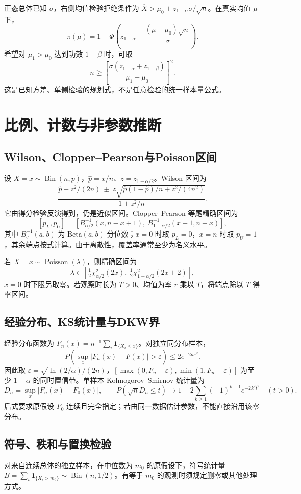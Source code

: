 \documentclass[../main.tex]{subfiles}
\begin{document}
正态总体已知 $\sigma$，右侧均值检验拒绝条件为 $\overline X>\mu_0+z_{1-\alpha}\sigma/\sqrt n$。在真实均值 $\mu$ 下，
\[
\pi(\mu)=1-\Phi\!\left(z_{1-\alpha}-\frac{(\mu-\mu_0)\sqrt n}{\sigma}\right).
\]
希望对 $\mu_1>\mu_0$ 达到功效 $1-\beta$ 时，可取
\[
n\ge\left[\frac{\sigma(z_{1-\alpha}+z_{1-\beta})}{\mu_1-\mu_0}\right]^2.
\]
这是已知方差、单侧检验的规划式，不是任意检验的统一样本量公式。

\section{比例、计数与非参数推断}
\subsection{Wilson、Clopper--Pearson与Poisson区间}
设 $X=x\sim\operatorname{Bin}(n,p)$，$\widehat p=x/n$、$z=z_{1-\alpha/2}$。Wilson 区间为
\[
\frac{\widehat p+z^2/(2n)\ \pm\ z\sqrt{\widehat p(1-\widehat p)/n+z^2/(4n^2)}}{1+z^2/n}.
\]
它由得分检验反演得到，仍是近似区间。Clopper--Pearson 等尾精确区间为
\[
[p_L,p_U]=[B^{-1}_{\alpha/2}(x,n-x+1),\ B^{-1}_{1-\alpha/2}(x+1,n-x)],
\]
其中 $B^{-1}_q(a,b)$ 为 Beta$(a,b)$ 分位数；$x=0$ 时取 $p_L=0$，$x=n$ 时取 $p_U=1$，其余端点按式计算。由于离散性，覆盖率通常至少为名义水平。

若 $X=x\sim\operatorname{Poisson}(\lambda)$，则精确区间为
\[
\lambda\in\left[\tfrac12\chi^2_{\alpha/2}(2x),\ \tfrac12\chi^2_{1-\alpha/2}(2x+2)\right],
\]
$x=0$ 时下限另取零。若观察时长为 $T>0$、均值为率 $r$ 乘以 $T$，将端点除以 $T$ 得率区间。

\subsection{经验分布、KS统计量与DKW界}
经验分布函数为 $F_n(x)=n^{-1}\sum_i\mathbf1_{\{X_i\le x\}}$。对独立同分布样本，
\[
P\!\left(\sup_x|F_n(x)-F(x)|>\varepsilon\right)\le2e^{-2n\varepsilon^2}.
\]
因此取 $\varepsilon=\sqrt{\ln(2/\alpha)/(2n)}$，$[\max(0,F_n-\varepsilon),\min(1,F_n+\varepsilon)]$ 为至少 $1-\alpha$ 的同时置信带。单样本 Kolmogorov--Smirnov 统计量为
\[
D_n=\sup_x|F_n(x)-F_0(x)|,\qquad
P(\sqrt nD_n\le t)\to1-2\sum_{k\ge1}(-1)^{k-1}e^{-2k^2t^2}\quad(t>0).
\]
后式要求原假设 $F_0$ 连续且完全指定；若由同一数据估计参数，不能直接沿用该零分布。

\subsection{符号、秩和与置换检验}
对来自连续总体的独立样本，在中位数为 $m_0$ 的原假设下，符号统计量 $B=\sum_i\mathbf1_{\{X_i>m_0\}}\sim\operatorname{Bin}(n,1/2)$。有等于 $m_0$ 的观测时须规定删零或其他处理方式。
\end{document}
